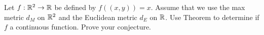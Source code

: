\begin{comment}
We consider the cases $a< 0$ and $a> 0$. Assume $a < 0$. Then $I = f^{-1}(B) = \left( \frac{t+\delta+b}{a}, \frac{t-\delta+b}{a} \right)$. To make the notation easier, let $r = \frac{t+\delta+b}{a}$ and $s = \frac{t-\delta+b}{a}$. For k from $1$ to $n-1$, let $c_k = r+k\beta$.  That is, $c_1 = r+\beta$, $c_2 = r+2 \beta$, $\ldots$, $c_{n-1} = r+(n-1) \beta$. Since $n \beta = 2\frac{\delta}{|a|}$, we have $s = r+n\beta = c_{n-1}+ \beta$. For $k$ from $1$ to $n-1$ let $J_k = (c_k - \beta, c_k + \beta) = \left(c_k - \frac{\alpha}{1-\alpha},  c_k + \frac{\alpha}{1-\alpha} \right) = B(c_k, \alpha)$ in $Y$ by part (a). By construction, $B(c_k, \alpha) \subset I$ for every $k$. If $x \in I$, then $r < x < s$. So there exists a positive integer $m$ such that $r+m \beta \leq x < r+(m+1) \beta$. Thus, $x \in (c_m-\beta, c_m+\beta) = B(c_m, \alpha)$. We conclude that $I = \bigcup_{1 \leq k \leq n-1} B(c_k, \alpha)$, and $f^{-1}(B)$ is open in $Y$. The case when $a > 0$ proceeds in the same manner, with $r = \frac{t-\delta+b}{a}$ and $s = \frac{t+\delta+b}{a}$. Therefore, $f^{-1}(B)$ is an open set in $Y$ and $f$ is a continuous function.

\ea

\end{comment}
 
\item Let $f: \mathbb{R}^2 \to \mathbb{R}$ be defined by $f((x,y)) = x$. Assume that we use the max metric $d_M$ on $\mathbb{R}^2$ and the Euclidean metric $d_E$ on $\mathbb{R}$. Use Theorem  to determine if $f$ a continuous function. Prove your conjecture. 	

\begin{comment}

\ExerciseSolution Let $B = (a-\delta, a+\delta)$ be an open ball in $\R$. Now $f^{-1}((a-\delta, a+\delta))$ is the set $A = (a-\delta, a+\delta) \times \R$ in $\R^2$. To show that $f^{-1}(B)$ is open in $\R^2$, we will demonstrate that $A$ is an open set in $\R^2$ with the max metric.

To simplify the notation, we will prove that $(a,b) \times \R$ is a union of open balls for any real numbers $a$ and $b$ with $a < b$. Let $\alpha = \frac{b-a}{2}$and let $c = \frac{b+a}{2}$. If $z = (z_1, z_2) \in \R^2$, recall that the open ball $B(z, \delta)$ in $\R^2$ with the max metric has the form 
\[B(z, \delta) = \{(x,y) \mid \max\{|x-z_1|, |y-z_2|\} < \delta \}.\]
If $y \in \R$, let $B_{y} = B((c,y),\alpha)$ in $\R^2, d_M)$. We will demonstrate that $\bigcup_{y \in \R} B_y = (a,b) \times \R$. 

Let $z = (z_1,z_2) \in \bigcup_{y \in \R} B_y$. Then there is a $t \in \R$ such that $z \in \bigcup_{t \in \R} B_t$. This implies that $|t-c| < \alpha$, or that $t \in (a,b)$. Thus, $z \in (a,b) \times \R$. 

Now let $w = (w_1, w_2)$ be in $(a,b) \times \R$. Then $w_1 \in (a,b)$ and $w_2 \in \R$. Since $w_1 \in (a,b)$, we have that $|w_1 - c| < \alpha$. So $w \in B_((w_1,w_2), \alpha)$. We conclude that $(a,b) \times \R = \bigcup_{y \in \R} B_y$. Therefore, $f^{-1}(B)$ is open in $\R^2$ with the max metric and $f$ is continuous.  

\end{comment}


